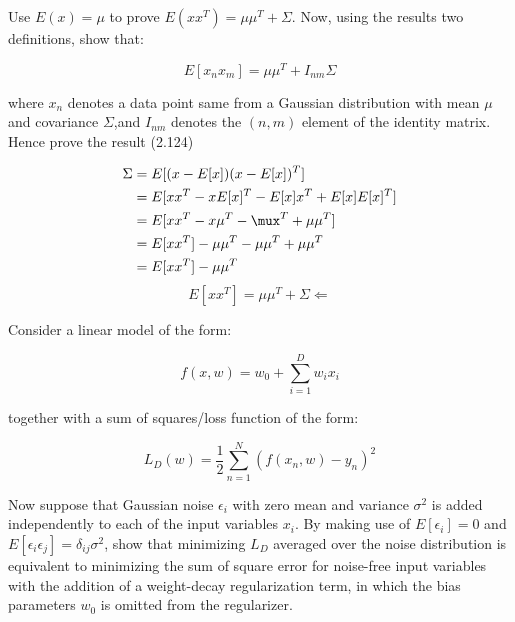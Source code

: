 \documentclass{homework}
\begin{document}
\newpage
\begin{problem}[2]
    Use $E(x) = \mu$ to prove $E(xx^T)=\mu\mu^T+\Sigma$. Now, using the results two definitions, show that:
    
    $$
    E[x_n x_m] = \mu\mu^T + I_{nm}\Sigma
    $$

    where $x_n$ denotes a data point same from a Gaussian distribution with mean $\mu$ and covariance $\Sigma$,and $I_{nm}$ denotes the $(n,m)$ element of the identity matrix. Hence prove the result (2.124)
\end{problem}

\begin{solution}
    \begin{equation*}
        \begin{split}
            \Sigma   & = E[(x-E[x])(x-E[x])^T ] \\
                & = E[xx^T-xE[x]^T - E[x]x^T + E[x]E[x]^T] \\
                & = E[xx^T - x\mu^T -\mux^T +\mu\mu^T] \\
                & = E[xx^T] - \mu\mu^T -\mu\mu^T + \mu\mu^T \\
                & = E[xx^T] - \mu\mu^T
        \end{split}
    \end{equation*}
    \begin{equation*}
        E[xx^T] = \mu\mu^T + \Sigma \Leftarrow
    \end{equation*}
\end{solution}
\newpage
\begin{problem}[3]
    Consider a linear model of the form:

    $$
    f(x,w) = w_0 + \sum_{i=1}^D w_i x_i
    $$

    together with a sum of squares/loss function of the form:

    $$
    L_D(w) = \frac{1}{2} \sum_{n=1}^{N} (f(x_n,w)-y_n)^2
    $$

    Now suppose that Gaussian noise $\epsilon_i$ with zero mean and variance $\sigma^2$ is added independently to each of the input variables $x_i$. By making use of $E[\epsilon_i]=0$ and $E[\epsilon_i \epsilon_j]=\delta_{ij}\sigma^2$, show that minimizing $L_D$ averaged over the noise distribution is equivalent to minimizing the sum of square error for noise-free input variables with the addition of a weight-decay regularization term, in which the bias parameters $w_0$ is omitted from the regularizer.
\end{problem}
\end{document}
